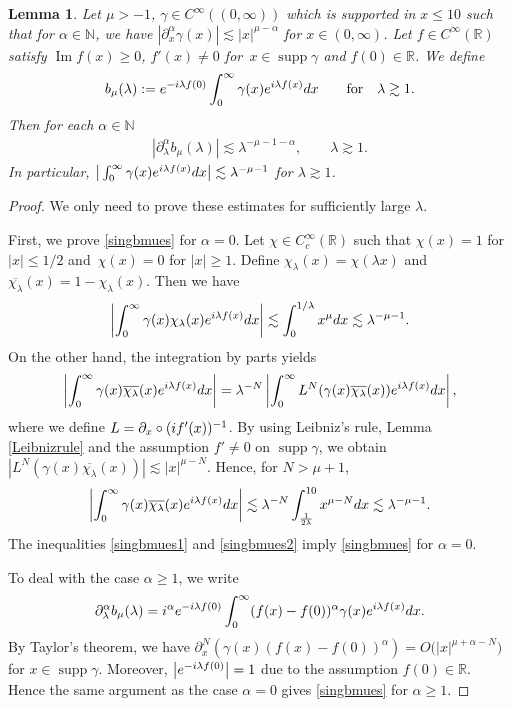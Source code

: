 \documentclass[11pt]{article}
\numberwithin{equation}{section}
\newtheorem{Lemma}[Theorem]{Lemma}
\def\R{\mathbb{R}}%
\DeclareMathOperator{\supp}{supp}%
\DeclareMathOperator{\im}{Im}%
\def\a{\alpha}
\def\c{\gamma}
\def\l{\lambda}
\def\m{\mu}
\def\pa{\partial}
\begin{document}
\begin{Lemma}\label{singularasym}
Let $\m>-1$, $\c\in C^{\infty}((0,\infty))$ which is supported in $x\leq 10$ such that for $\a\in\mathbb{N}$, we have $|\pa_x^{\a}\c(x)|\lesssim |x|^{\m-\a}$ for $x\in (0,\infty)$. Let $f\in C^{\infty}(\R)$ satisfy $\im f(x)\geq 0$, $f'(x)\neq 0$ for~${x\in \supp \c}$ and $f(0)\in \R$. We define
\begin{align*}
b_{\m}(\l):={\rm e}^{-{\rm i}\l f(0)}\int_{0}^{\infty}\c(x){\rm e}^{{\rm i}\l f(x)}{\rm d}x\qquad \text{for}\quad \l\gtrsim 1.
\end{align*}
Then for each $\a\in\mathbb{N}$
\begin{align}\label{singbmues}
|\partial_{\l}^{\a}b_{\m}(\l)|\lesssim \l^{-\m-1-\a},\qquad \l\gtrsim 1.
\end{align}
In particular, $\big|\int_{0}^{\infty}\c(x){\rm e}^{{\rm i}\l f(x)}{\rm d}x\big|\lesssim \l^{-\m-1}$ for $\l\gtrsim 1$.
\end{Lemma}

\begin{proof}
We only need to prove these estimates for sufficiently large $\l$.

First, we prove \eqref{singbmues} for $\a=0$. Let $\chi\in C_c^{\infty}(\R)$ such that $\chi(x)=1$ for $|x|\leq 1/2$ and~${\chi(x)=0}$ for $|x|\geq 1$. Define $\chi_{\l}(x)=\chi(\l x)$ and $\overline{\chi_\l}(x)=1-\chi_{\l}(x)$. Then we have
\begin{align}\label{singbmues1}
\left|\int_{0}^{\infty}\c(x)\chi_{\l}(x){\rm e}^{{\rm i}\l f(x)}{\rm d}x\right|\lesssim \int_{0}^{1/\l}x^{\m}{\rm d}x\lesssim {\l}^{-\m-1}.
\end{align}
On the other hand, the integration by parts yields
\begin{align*}
\left|\int_{0}^{\infty}\c(x)\overline{\chi_{\l}}(x){\rm e}^{{\rm i}\l f(x)}{\rm d}x\right|=\l^{-N}\left|\int_{0}^{\infty}L^N(\c(x)\overline{\chi_{\l}}(x)){\rm e}^{{\rm i}\l f(x)}{\rm d}x\right|,
\end{align*}
where we define $L=\pa_x\circ ({\rm i}f'(x))^{-1}$. By using Leibniz's rule, Lemma \ref{Leibnizrule} and the assumption $f'\neq 0$ on $\supp \c$, we obtain $|L^{N}(\c(x)\overline{\chi_\l}(x))|\lesssim |x|^{\m-N}$. Hence, for $N>\m+1$,
\begin{align}\label{singbmues2}
\left|\int_{0}^{\infty}\c(x)\overline{\chi_{\l}}(x){\rm e}^{{\rm i}\l f(x)}{\rm d}x\right|\lesssim \l^{-N}\int_{\frac{1}{2\l}}^{10}x^{\m-N}{\rm d}x \lesssim \l^{-\m-1}.
\end{align}
The inequalities \eqref{singbmues1} and \eqref{singbmues2} imply \eqref{singbmues} for $\a=0$.

To deal with the case $\a\geq 1$, we write
\begin{align*}
\pa_{\l}^{\a}b_{\m}(\l)={\rm i}^{\a}{\rm e}^{-{\rm i}\l f(0)}\int_0^{\infty}(f(x)-f(0))^{\a}\c(x){\rm e}^{{\rm i}\l f(x)}{\rm d}x.
\end{align*}
By Taylor's theorem, we have $\pa_x^{N}(\c(x)(f(x)-f(0))^{\a})=O\bigl(|x|^{\m+\a-N}\bigr)$ for $x\in \supp \c$. Moreover, $\big|{\rm e}^{-{\rm i}\l f(0)}\big|=1$ due to the assumption $f(0)\in \R$.
Hence the same argument as the case $\a=0$ gives \eqref{singbmues} for $\a\geq 1$.
\end{proof}
\end{document}
